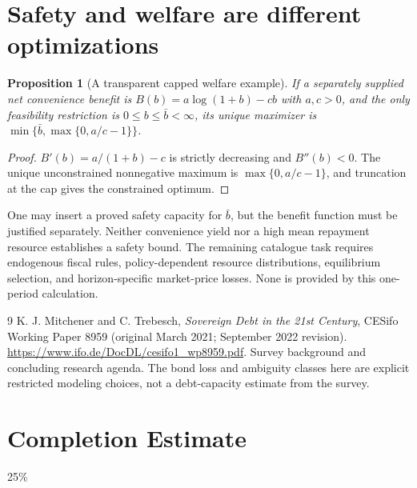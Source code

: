\documentclass[11pt,a4paper]{article}
\newtheorem{proposition}[theorem]{Proposition}
\theoremstyle{definition}
\theoremstyle{remark}
\begin{document}
\section{Safety and welfare are different optimizations}
\begin{proposition}[A transparent capped welfare example]
If a separately supplied net convenience benefit is $B(b)=a\log(1+b)-cb$ with $a,c>0$, and the only feasibility restriction is $0\le b\le\bar b<\infty$, its unique maximizer is
$\min\{\bar b,\max\{0,a/c-1\}\}$.
\end{proposition}
\begin{proof}
$B'(b)=a/(1+b)-c$ is strictly decreasing and $B''(b)<0$. The unique unconstrained nonnegative maximum is $\max\{0,a/c-1\}$, and truncation at the cap gives the constrained optimum.
\end{proof}
One may insert a proved safety capacity for $\bar b$, but the benefit function must be justified separately. Neither convenience yield nor a high mean repayment resource establishes a safety bound. The remaining catalogue task requires endogenous fiscal rules, policy-dependent resource distributions, equilibrium selection, and horizon-specific market-price losses. None is provided by this one-period calculation.
\begin{thebibliography}{9}
 K. J. Mitchener and C. Trebesch, \emph{Sovereign Debt in the 21st Century}, CESifo Working Paper 8959 (original March 2021; September 2022 revision). \url{https://www.ifo.de/DocDL/cesifo1_wp8959.pdf}. Survey background and concluding research agenda. The bond loss and ambiguity classes here are explicit restricted modeling choices, not a debt-capacity estimate from the survey.
\end{thebibliography}

\section{Completion Estimate}
25\%
\end{document}
